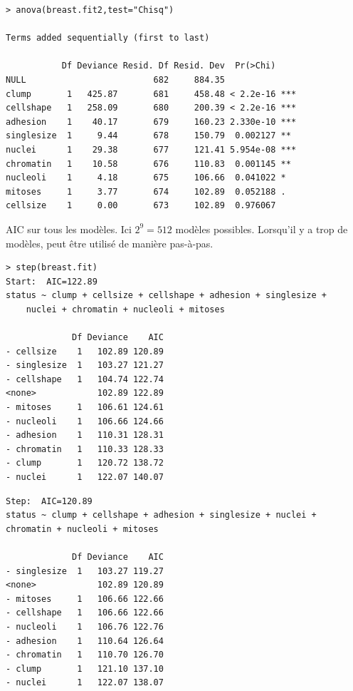 \documentclass{BeamerTemplate}
\begin{document}
\begin{refsection}
\begin{frame}[fragile]{}
{\begin{verbatim}
> anova(breast.fit2,test="Chisq")

Terms added sequentially (first to last)

           Df Deviance Resid. Df Resid. Dev  Pr(>Chi)    
NULL                         682     884.35              
clump       1   425.87       681     458.48 < 2.2e-16 ***
cellshape   1   258.09       680     200.39 < 2.2e-16 ***
adhesion    1    40.17       679     160.23 2.330e-10 ***
singlesize  1     9.44       678     150.79  0.002127 ** 
nuclei      1    29.38       677     121.41 5.954e-08 ***
chromatin   1    10.58       676     110.83  0.001145 ** 
nucleoli    1     4.18       675     106.66  0.041022 *  
mitoses     1     3.77       674     102.89  0.052188 .  
cellsize    1     0.00       673     102.89  0.976067    
\end{verbatim}
}
\end{frame}

\begin{frame}[fragile]{}
AIC sur tous les modèles. Ici $2^9 = 512$ modèles possibles. Lorsqu'il y a trop de modèles, peut être
utilisé de manière pas-à-pas.

{\tiny
\begin{verbatim}
> step(breast.fit)
Start:  AIC=122.89
status ~ clump + cellsize + cellshape + adhesion + singlesize + 
    nuclei + chromatin + nucleoli + mitoses

             Df Deviance    AIC
- cellsize    1   102.89 120.89
- singlesize  1   103.27 121.27
- cellshape   1   104.74 122.74
<none>            102.89 122.89
- mitoses     1   106.61 124.61
- nucleoli    1   106.66 124.66
- adhesion    1   110.31 128.31
- chromatin   1   110.33 128.33
- clump       1   120.72 138.72
- nuclei      1   122.07 140.07

\end{verbatim}
}
\end{frame}

\begin{frame}[fragile]{}
{\tiny
\begin{verbatim}
Step:  AIC=120.89
status ~ clump + cellshape + adhesion + singlesize + nuclei +  chromatin + nucleoli + mitoses

             Df Deviance    AIC
- singlesize  1   103.27 119.27
<none>            102.89 120.89
- mitoses     1   106.66 122.66
- cellshape   1   106.66 122.66
- nucleoli    1   106.76 122.76
- adhesion    1   110.64 126.64
- chromatin   1   110.70 126.70
- clump       1   121.10 137.10
- nuclei      1   122.07 138.07


\end{verbatim}}
\end{frame}
\end{refsection}
\end{document}
